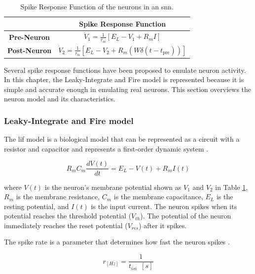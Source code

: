 \begin{table}[H]
    \centering
    \begin{tabular}{cc}
        \toprule
        & \textbf{Spike Response Function} \\
        \midrule
        \textbf{Pre-Neuron} & $\dot{V}_1 = \frac{1}{\tau_m} \left[ E_L - V_1 + R_m I \right]$ \\
        \midrule
        \textbf{Post-Neuron} & $\dot{V}_2 = \frac{1}{\tau_m} \left[ E_L - V_2 + R_m \left( W \delta (t - t_{\text{pre}}) \right) \right]$ \\
        \bottomrule
    \end{tabular}
    \caption{Spike Response Function of the neurons in an \ac{snn}.}
    \label{Table.SRF}
\end{table}

Several spike response functions have been proposed to emulate neuron activity. In this chapter, the Leaky-Integrate and Fire model is represented because it is simple and accurate enough in emulating real neurons. This section overviews the neuron model and its characteristics.


\subsubsection{Leaky-Integrate and Fire model}
The \ac{lif} model is a biological model that can be represented as a circuit with a resistor and capacitor and represents a first-order dynamic system \cite{Ch_1_R13}.

\begin{equation} \label{Eq.1}
    R_{m}C_{m}\frac{dV\left(t\right)}{dt} = E_{L} - V\left(t\right) + R_{m}I\left(t\right)
\end{equation}

\noindent where $V(t)$ is the neuron's membrane potential shown as \(V_{1}\) and \(V_{2}\) in Table \ref{Table.SRF}, $R_{m}$ is the membrane resistance, $C_{m}$ is the membrane capacitance, $E_{L}$ is the resting potential, and $I(t)$ is the input current. The neuron spikes when its potential reaches the threshold potential ($V_{th}$). The potential of the neuron immediately reaches the reset potential ($V_{res}$) after it spikes.


The spike rate is a parameter that determines how fast the neuron spikes \cite{Ch_1_R11}.

\begin{equation} \label{Eq.4}
    r_{[Hz]} = \frac{1}{t_{isi}\enspace [s]}
\end{equation}

